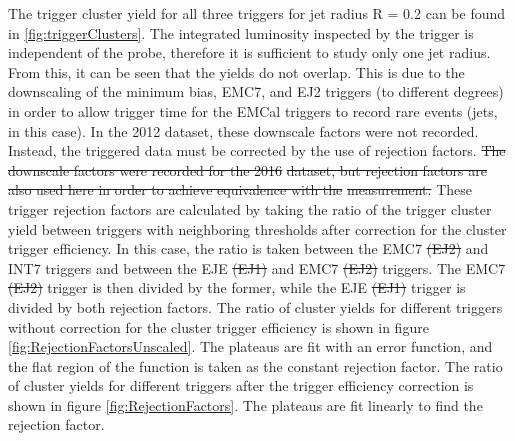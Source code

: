 \documentclass[ALICE]{ALICE_analysis_notes}
\newcommand{\pPb}{{\mbox{p--Pb}}\xspace}
\newcommand{\pp}{pp\xspace}
\providecommand{\DIFdeltex}[1]{{\protect\color{red}\sout{#1}}}                      %
\providecommand{\DIFdelbegin}{} %
\providecommand{\DIFdelend}{} %
\providecommand{\DIFdel}[1]{\texorpdfstring{\DIFdeltex{#1}}{}} %
\newcommand{\DIFscaledelfig}{0.5}
\newlength{\DIFdelgraphicswidth} %
\newlength{\DIFdelgraphicsheight} %
\newcommand{\DIFdelincludegraphics}[2][]{%
\sbox{\DIFdelgraphicsbox}{\DIFOincludegraphics[#1]{#2}}%
\settoboxwidth{\DIFdelgraphicswidth}{\DIFdelgraphicsbox} %
\settoboxtotalheight{\DIFdelgraphicsheight}{\DIFdelgraphicsbox} %
\scalebox{\DIFscaledelfig}{%
\parbox[b]{\DIFdelgraphicswidth}{\usebox{\DIFdelgraphicsbox}\\[-\baselineskip] \rule{\DIFdelgraphicswidth}{0em}}\llap{\resizebox{\DIFdelgraphicswidth}{\DIFdelgraphicsheight}{%
\setlength{\unitlength}{\DIFdelgraphicswidth}%
\begin{picture}(1,1)%
\thicklines\linethickness{2pt} %
{\color[rgb]{1,0,0}\put(0,0){\framebox(1,1){}}}%
{\color[rgb]{1,0,0}\put(0,0){\line( 1,1){1}}}%
{\color[rgb]{1,0,0}\put(0,1){\line(1,-1){1}}}%
\end{picture}%
}\hspace*{3pt}}} %
} %
\DeclareRobustCommand{\DIFdelbegin}{\DIFOdelbegin \let\includegraphics\DIFdelincludegraphics} %
\DeclareRobustCommand{\DIFdelend}{\DIFOaddend \let\includegraphics\DIFOincludegraphics} %
\begin{document}
The trigger cluster yield for all three triggers for jet radius R = 0.2 can be found in \ref{fig:triggerClusters}. The integrated luminosity inspected by the trigger is independent of the probe, therefore it is sufficient to study only one jet radius. From this, it can be seen that the yields do not overlap. This is due to the downscaling of the minimum bias, EMC7, and EJ2 triggers (to different degrees) in order to allow trigger time for the EMCal triggers to record rare events (jets, in this case). In the 2012 dataset, these downscale factors were not recorded. Instead, the triggered data must be corrected by the use of rejection factors. \DIFdelbegin \DIFdel{The downscale factors were recorded for the 2016 }%
\DIFdel{dataset, but rejection factors are also used here in order to achieve equivalence with the }%
\DIFdel{measurement. }\DIFdelend These trigger rejection factors are calculated by taking the ratio of the trigger cluster yield between triggers with neighboring thresholds after correction for the cluster trigger efficiency. In this case, the ratio is taken between the EMC7 \DIFdelbegin \DIFdel{(EJ2) }\DIFdelend and INT7 triggers and between the EJE \DIFdelbegin \DIFdel{(EJ1) }\DIFdelend and EMC7 \DIFdelbegin \DIFdel{(EJ2) }\DIFdelend triggers. The EMC7 \DIFdelbegin \DIFdel{(EJ2) }\DIFdelend trigger is then divided by the former, while the EJE \DIFdelbegin \DIFdel{(EJ1) }\DIFdelend trigger is divided by both rejection factors. The ratio of cluster yields for different triggers without correction for the cluster trigger efficiency is shown in figure \ref{fig:RejectionFactorsUnscaled}. The plateaus are fit with an error function, and the flat region of the function is taken as the constant rejection factor. The ratio of cluster yields for different triggers after the trigger efficiency correction is shown in figure \ref{fig:RejectionFactors}. The plateaus are fit linearly to find the rejection factor.
\end{document}
